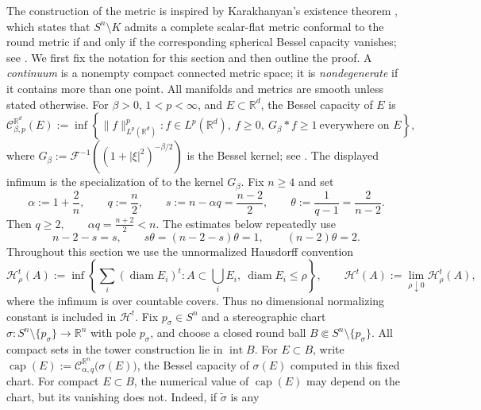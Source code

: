 \documentclass[12pt,oneside,a4paper]{article}
\theoremstyle{mytheorem}
\theoremstyle{remark}
\theoremstyle{definition}
\begin{document}
The construction of the metric is inspired by Karakhanyan's existence
theorem \cite[Theorem~1.1]{zbMATH07873599}, which states that
$S^n\setminus K$ admits a complete scalar-flat metric conformal to the
round metric if and only if the corresponding spherical Bessel capacity
vanishes; see \cite[Section~2.2]{zbMATH07873599}. We first fix the notation
for this section and then outline the proof. A \emph{continuum} is a
nonempty compact connected metric space; it is
\emph{nondegenerate} if it contains more than one point.  All manifolds
and metrics are smooth unless stated otherwise.
For \(\beta>0\), \(1<p<\infty\), and \(E\subset\mathbb R^d\), the Bessel
capacity of \(E\) is
\[
\mathcal{C}_{\beta,p}^{\mathbb R^d}(E)
:=
\inf\left\{
\|f\|_{L^p(\mathbb R^d)}^p:
f\in L^p(\mathbb R^d),\ f\geq0,\
G_\beta*f\geq1\ \text{everywhere on }E
\right\},
\]
where
\(G_\beta:=\mathcal{F}^{-1}((1+|\xi|^2)^{-\beta/2})\) is the Bessel
kernel; see
\cite[\S1.2.4]{zbMATH00824833}.  The displayed infimum is the
specialization of \cite[Definition~2.3.3]{zbMATH00824833} to the
kernel \(G_\beta\).
Fix \(n\geq4\) and set
\begin{equation}\label{eq:parameters}
\alpha:=1+\frac2n,
\qquad
q:=\frac n2,
\qquad
s:=n-\alpha q=\frac{n-2}{2},
\qquad
\theta:=\frac1{q-1}=\frac2{n-2}.
\end{equation}
Then
$q\geq2,\qquad\alpha q=\frac{n+2}{2}<n.$
The estimates below repeatedly use
\begin{equation}\label{eq:driving-identities}
n-2-s=s,
\qquad
s\theta=(n-2-s)\theta=1,
\qquad
(n-2)\theta=2.
\end{equation}
Throughout this section we use the unnormalized Hausdorff convention
\[
 \mathcal{H}^t_\rho(A)
 :=\inf\left\{\sum_i(\operatorname{diam}E_i)^t:
 A\subset\bigcup_iE_i,\ \operatorname{diam}E_i\leq\rho\right\},
 \qquad
 \mathcal{H}^t(A):=\lim_{\rho\downarrow0}\mathcal{H}^t_\rho(A),
\]
where the infimum is over countable covers.  Thus no dimensional
normalizing constant is included in \(\mathcal{H}^t\).
Fix $p_\sigma\in S^n$ and a stereographic chart
$\sigma: S^n\setminus\{p_\sigma\}\to \mathbb R^n$ with pole
\(p_\sigma\), and choose a closed round ball
\(B\Subset S^n\setminus\{p_\sigma\}\).  All compact sets in the tower
construction lie in \(\operatorname{int}B\).  For \(E\subset B\), write
$\operatorname{cap}(E):=
\mathcal{C}_{\alpha,q}^{\mathbb R^n}\bigl(\sigma(E)\bigr)$, the Bessel capacity
of \(\sigma(E)\) computed in this fixed chart.
For compact $E\subset B$, the numerical value of $\operatorname{cap}(E)$
may depend on the chart,
but its vanishing does not.  Indeed, if $\widetilde\sigma$ is any
\end{document}
